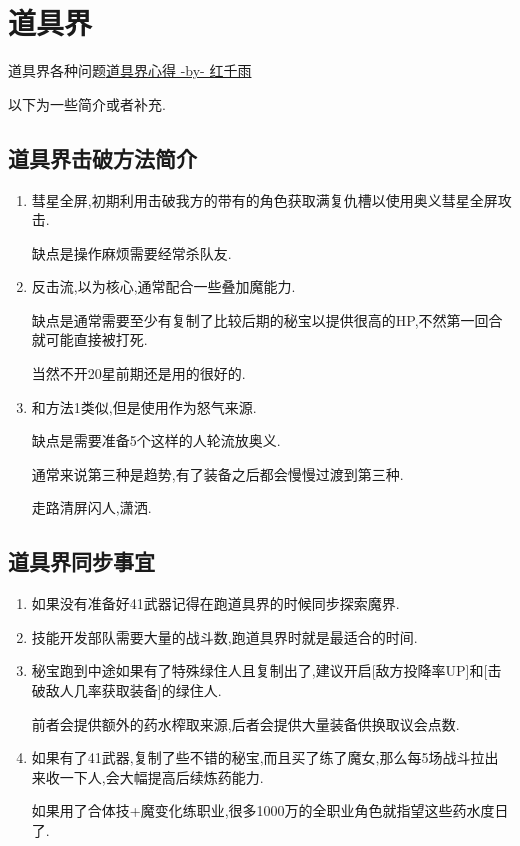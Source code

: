 	\newpage

	\section{道具界}

	道具界各种问题\href{http://tieba.baidu.com/p/3730196003}{道具界心得 -by- 红千雨}

	以下为一些简介或者补充.

	\subsection{道具界击破方法简介}

	\begin{enumerate}

		\item
		彗星全屏,初期利用击破我方的带有{\color{red}{自我牺牲}}的角色获取满复仇槽以使用奥义彗星全屏攻击.
		
		缺点是操作麻烦需要经常杀队友.

		\item
		反击流,以{\color{red}{强制反击+防御必定反击}}为核心,通常配合一些叠加魔能力.

		缺点是通常需要至少有复制了比较后期的秘宝以提供很高的HP,不然第一回合就可能直接被打死.

		当然不开20星前期还是用的很好的.

		\item
		和方法1类似,但是使用{\color{red}{41号武器}}作为怒气来源.

		缺点是需要准备5个这样的人轮流放奥义.

		通常来说第三种是趋势,有了装备之后都会慢慢过渡到第三种.

		走路清屏闪人,潇洒.

	\end{enumerate}

	\subsection{道具界同步事宜}

	\begin{enumerate}
		\item
		如果没有准备好41武器记得在跑道具界的时候同步探索魔界.

		\item
		技能开发部队需要大量的战斗数,跑道具界时就是最适合的时间.

		\item
		秘宝跑到中途如果有了特殊绿住人且复制出了,建议开启[敌方投降率UP]和[击破敌人几率获取装备]的绿住人.

		前者会提供额外的药水榨取来源,后者会提供大量装备供换取议会点数.

		\item
		如果有了41武器,复制了些不错的秘宝,而且买了练了魔女,那么每5场战斗拉出来收一下人,会大幅提高后续炼药能力.

		如果用了合体技+魔变化练职业,很多1000万的全职业角色就指望这些药水度日了.

	\end{enumerate}


